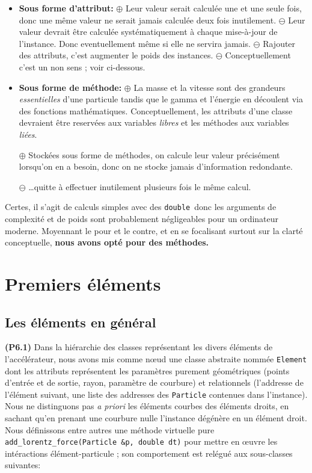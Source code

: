 \documentclass[12pt, letterpaper, twoside]{article}
\newcommand{\T}[1]{\texttt{#1}}
\newcommand{\double}{\texttt{double}}
\begin{document}
\begin{itemize}

\item \textbf{Sous forme d'attribut:}
\subitem $\oplus$ Leur valeur serait calculée une et une seule fois, donc une même valeur ne serait jamais calculée deux fois inutilement.
\subitem $\ominus$ Leur valeur devrait être calculée systématiquement à chaque mise-à-jour de l'instance. Donc eventuellement même si elle ne servira jamais.
\subitem $\ominus$ Rajouter des attributs, c'est augmenter le poids des instances.
\subitem $\ominus$ Conceptuellement c'est un non sens ; voir ci-dessous.

\item \textbf{Sous forme de méthode:}
\subitem $\oplus$ La masse et la vitesse sont des grandeurs \textit{essentielles} d'une particule tandis que le gamma et l'énergie en découlent via des fonctions mathématiques. Conceptuellement, les attributs d'une classe devraient être reservées aux variables \textit{libres} et les méthodes aux variables \textit{liées}.

\subitem $\oplus$ Stockées sous forme de méthodes, on calcule leur valeur précisément lorsqu'on en a besoin, donc on ne stocke jamais d'information redondante.

\subitem $\ominus$ \ldots quitte à effectuer inutilement plusieurs fois le même calcul.
\end{itemize}
\bigskip
Certes, il s'agit de calculs simples avec des \double\ donc les arguments de complexité et de poids sont probablement négligeables pour un ordinateur moderne. Moyennant le pour et le contre, et en se focalisant surtout sur la clarté conceptuelle, \textbf{nous avons opté pour des méthodes.}

\section{Premiers éléments}

\subsection{Les éléments en général}
\noindent \textbf{(P6.1)} Dans la hiérarchie des classes représentant les divers éléments de l'accélérateur, nous avons mis comme nœud une classe abstraite nommée \T{Element} dont les attributs représentent les paramètres purement géométriques (points d'entrée et de sortie, rayon, paramètre de courbure) et relationnels (l'addresse de l'élément suivant, une liste des addresses des \T{Particle} contenues dans l'instance). Nous ne distinguons pas \textit{a priori} les éléments courbes des éléments droits, en sachant qu'en prenant une courbure nulle l'instance dégénère en un élément droit. Nous définissons entre autres une méthode virtuelle pure \T{add\_lorentz\_force(Particle \&p, double dt)} pour mettre en œuvre les intéractions élément-particule ; son comportement est relégué aux sous-classes suivantes:
\end{document}
